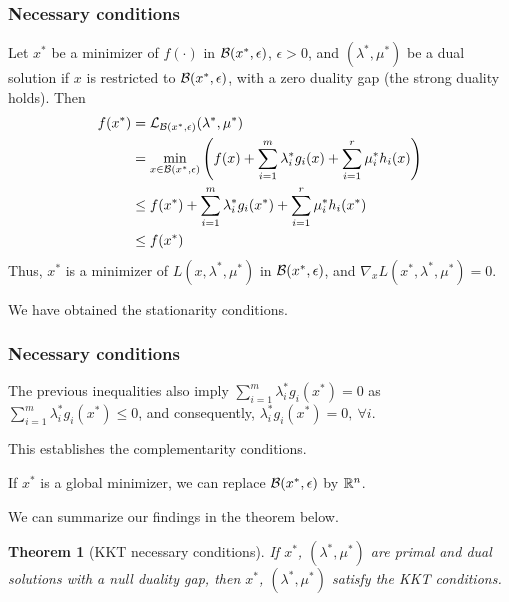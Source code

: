 \documentclass[usepdftitle=false]{beamer}
\newtheorem{thm}{Theorem}
\begin{document}
\begin{frame}
	\frametitle{Necessary conditions}
	
	Let $x^*$ be a minimizer of $f(\cdot)$ in ${\mathcal{B}}(x^*,\epsilon)$, $\epsilon > 0$, and $(\lambda^*, \mu^*)$ be a dual solution if $x$ is restricted to ${\mathcal{B}}(x^*,\epsilon)$, with a zero duality gap (the strong duality holds). Then
	\begin{align*}
		f(x^*) &= {\mathcal{L}}_{{\mathcal{B}}(x^*, \epsilon)}(\lambda^*, \mu^*) \\
		&= \min_{x \in {\mathcal{B}}(x^*,\epsilon)} \left( f(x) + \sum_{i = 1}^m \lambda_i^* g_i(x) + \sum_{i = 1}^r \mu_i^* h_i(x) \right) \\
		& \leq f(x^*) + \sum_{i = 1}^m \lambda_i^* g_i(x^*) + \sum_{i = 1}^r \mu_i^* h_i(x^*) \\
		& \leq f(x^*)
	\end{align*}
	Thus, $x^*$ is a minimizer of $L(x, \lambda^*, \mu^*)$ in ${\mathcal{B}}(x^*,\epsilon)$, and $\nabla_x L(x^*, \lambda^*, \mu^*) = 0$.
	
	\mbox{}
	
We have obtained the stationarity conditions.
	
\end{frame}

\begin{frame}
	\frametitle{Necessary conditions}
	
	The previous inequalities also imply $\sum_{i = 1}^m \lambda_i^* g_i(x^*) = 0$ as $\sum_{i = 1}^m \lambda_i^* g_i(x^*) \leq 0$, and consequently, $\lambda_i^* g_i(x^*) = 0,\ \forall i$.
	
	\mbox{}
	
	This establishes the complementarity conditions.
	
	\mbox{}
	
	If $x^*$ is a global minimizer, we can replace ${\mathcal{B}}(x^*,\epsilon)$ by ${\mathbb{R}}^n$.
	
	\mbox{}
	
	We can summarize our findings in the theorem below.
\begin{thm}[KKT necessary conditions]
	If $x^*$, $(\lambda^*, \mu^*)$ are primal and dual solutions with a null duality gap, then $x^*$, $(\lambda^*, \mu^*)$ satisfy the KKT conditions.
\end{thm}

\end{frame}
\end{document}
